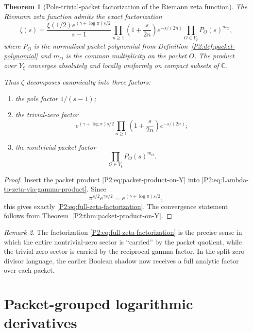 \documentclass[11pt,a4paper]{article}
\numberwithin{equation}{section}
\newtheorem{theorem}{Theorem}[section]
\theoremstyle{definition}
\theoremstyle{remark}
\newtheorem{remark}[theorem]{Remark}
\newcommand{\CC}{\mathbb C}
\begin{document}
\begin{theorem}[Pole-trivial-packet factorization of the Riemann zeta function]\label{P2:thm:full-zeta-factorization}
The Riemann zeta function admits the exact factorization
\begin{equation}\label{P2:eq:full-zeta-factorization}
\zeta(s)
=
\frac{\xi(1/2)e^{(\gamma+\log\pi)s/2}}{s-1}
\prod_{n\ge 1}\left(1+\frac{s}{2n}\right)e^{-s/(2n)}
\prod_{O\in Y_\xi} P_O(s)^{m_O},
\end{equation}
where $P_O$ is the normalized packet polynomial from Definition~\ref{P2:def:packet-polynomial} and $m_O$ is the common multiplicity on the packet $O$.  The product over $Y_\xi$ converges absolutely and locally uniformly on compact subsets of $\CC$.

Thus $\zeta$ decomposes canonically into three factors:
\begin{enumerate}[label=(\roman*)]
\item the pole factor $1/(s-1)$;
\item the trivial-zero factor
\[
e^{(\gamma+\log\pi)s/2}\prod_{n\ge 1}\left(1+\frac{s}{2n}\right)e^{-s/(2n)};
\]
\item the nontrivial packet factor
\[
\prod_{O\in Y_\xi} P_O(s)^{m_O}.
\]
\end{enumerate}
\end{theorem}

\begin{proof}
Insert the packet product \eqref{P2:eq:packet-product-on-Y} into \eqref{P2:eq:Lambda-to-zeta-via-gamma-product}.  Since
\[
\pi^{s/2}e^{\gamma s/2}=e^{(\gamma+\log\pi)s/2},
\]
this gives exactly \eqref{P2:eq:full-zeta-factorization}.  The convergence statement follows from Theorem~\ref{P2:thm:packet-product-on-Y}.
\end{proof}

\begin{remark}
The factorization \eqref{P2:eq:full-zeta-factorization} is the precise sense in which the entire nontrivial-zero sector is ``carried'' by the packet quotient, while the trivial-zero sector is carried by the reciprocal gamma factor.  In the split-zero divisor language, the earlier Boolean shadow now receives a full analytic factor over each packet.
\end{remark}

\section{Packet-grouped logarithmic derivatives}
\end{document}
